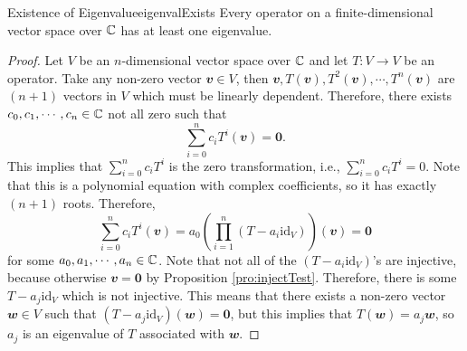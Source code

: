 \documentclass[math, code]{amznotes}
\theoremstyle{remark}
\newcommand{\zero}{\mathbf{0}}
\begin{document}
\begin{probox}{Existence of Eigenvalue}{eigenvalExists}
    Every operator on a finite-dimensional vector space over $\mathbb{C}$ has at least one eigenvalue.
    \tcblower
    \begin{proof}
        Let $V$ be an $n$-dimensional vector space over $\mathbb{C}$ and let $T \colon V \to V$ be an operator. Take any non-zero vector $\mathbfit{v} \in V$, then $\mathbfit{v}, T(\mathbfit{v}), T^2(\mathbfit{v}), \cdots, T^n(\mathbfit{v})$ are $(n + 1)$ vectors in $V$ which must be linearly dependent. Therefore, there exists $c_0, c_1, \cdots, c_n \in \mathbb{C}$ not all zero such that 
        \begin{equation*}
            \sum_{i = 0}^{n}c_iT^i(\mathbfit{v}) = \zero.
        \end{equation*}
        This implies that $\sum_{i = 0}^{n}c_iT^i$ is the zero transformation, i.e., $\sum_{i = 0}^{n}c_iT^i = 0$. Note that this is a polynomial equation with complex coefficients, so it has exactly $(n + 1)$ roots. Therefore, 
        \begin{equation*}
            \sum_{i = 0}^{n}c_iT^i(\mathbfit{v}) = a_0\left(\prod_{i = 1}^{n}(T - a_i\mathrm{id}_V)\right)(\mathbfit{v}) = \zero
        \end{equation*}
        for some $a_0, a_1, \cdots, a_n \in \mathbb{C}$. Note that not all of the $(T - a_i\mathrm{id}_V)$'s are injective, because otherwise $\mathbfit{v} = \zero$ by Proposition \ref{pro:injectTest}. Therefore, there is some $T - a_j\mathrm{id}_V$ which is not injective. This means that there exists a non-zero vector $\mathbfit{w} \in V$ such that $(T - a_j\mathrm{id}_V)(\mathbfit{w}) = \zero$, but this implies that $T(\mathbfit{w}) = a_j\mathbfit{w}$, so $a_j$ is an eigenvalue of $T$ associated with $\mathbfit{w}$.
    \end{proof}
\end{probox}
\end{document}
